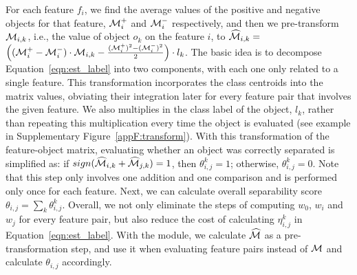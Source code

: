 For each feature $f_i$, we find the average values of the positive and negative objects for that feature, ${\mathcal{M}}_i^+$ and ${\mathcal{M}}_i^-$ respectively, and then we pre-transform ${\mathcal{M}}_{i,k}$, i.e., the value of object $o_k$ on the feature $i$, to $\widehat{{\mathcal{M}}}_{i,k}=$ $\Big( ({\mathcal{M}}_i^+-{\mathcal{M}}_i^-)\cdot {\mathcal{M}}_{i,k}-\frac{({\mathcal{M}}_i^+)^2-({\mathcal{M}}_i^-)^2}{2} \Big) \cdot l_k$.
The basic idea is to decompose
Equation~\ref{eqn:est_label} into two components,
with each one only related to a single feature.
This transformation incorporates
the class centroids into the matrix values,
obviating their integration later
for every feature pair that involves the given feature.
We also multiplies
in the class label of the object, $l_k$,
rather than repeating this multiplication every time the object is evaluated (see example in Supplementary Figure~\ref{appF:transform}). With this transformation of the feature-object matrix,
evaluating whether an object was correctly separated is simplified as: if $sign(\widehat{{\mathcal{M}}}_{i,k} + \widehat{{\mathcal{M}}}_{j,k}) = 1$, then $\theta_{i,j}^{k}=1$; otherwise, $\theta_{i,j}^{k}=0$. 
Note that this step only involves one addition and one comparison and is performed only once for each feature.
Next, we can calculate overall separability score $\theta_{i,j} = \sum_{k}{\theta_{i,j}^{k}}$. Overall,
we not only eliminate the steps of computing
$w_0$, $w_i$ and $w_j$ for every feature pair,
but also reduce the cost of calculating
$\eta_{i,j}^{k}$ in Equation~\ref{eqn:est_label}.
With the \trans module, we calculate $\widehat{{\mathcal{M}}}$ as a pre-transformation step,
and use it when evaluating feature pairs instead of ${\mathcal{M}}$ and calculate $\theta_{i,j}$ accordingly.



